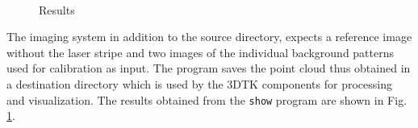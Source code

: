 \begin{figure}[ht!]
\quad
{}\\
\caption{Results}
\label{figure:results}
\end{figure}

The imaging system in addition to the source directory, expects a reference
image without the laser stripe and two images of the individual background
patterns used for calibration as input. The program saves the point cloud thus
obtained in a destination directory which is used by the \ac{3DTK} components
for processing and visualization. The results obtained from the
\texttt{show} program are shown in Fig. \ref{figure:results}.
